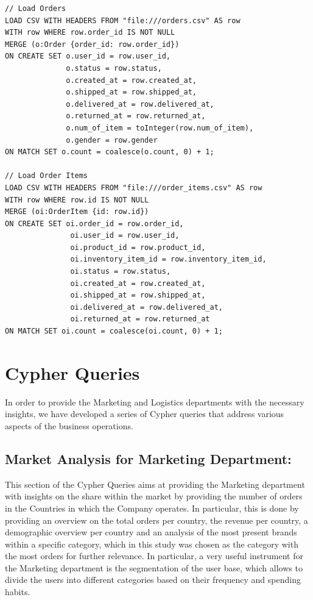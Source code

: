 \documentclass[a4paper,12pt]{article}
\begin{document}
\begin{verbatim}
// Load Orders
LOAD CSV WITH HEADERS FROM "file:///orders.csv" AS row
WITH row WHERE row.order_id IS NOT NULL
MERGE (o:Order {order_id: row.order_id})
ON CREATE SET o.user_id = row.user_id,
              o.status = row.status,
              o.created_at = row.created_at,
              o.shipped_at = row.shipped_at,
              o.delivered_at = row.delivered_at,
              o.returned_at = row.returned_at,
              o.num_of_item = toInteger(row.num_of_item),
              o.gender = row.gender
ON MATCH SET o.count = coalesce(o.count, 0) + 1;

// Load Order Items
LOAD CSV WITH HEADERS FROM "file:///order_items.csv" AS row
WITH row WHERE row.id IS NOT NULL
MERGE (oi:OrderItem {id: row.id})
ON CREATE SET oi.order_id = row.order_id,
               oi.user_id = row.user_id,
               oi.product_id = row.product_id,
               oi.inventory_item_id = row.inventory_item_id,
               oi.status = row.status,
               oi.created_at = row.created_at,
               oi.shipped_at = row.shipped_at,
               oi.delivered_at = row.delivered_at,
               oi.returned_at = row.returned_at
ON MATCH SET oi.count = coalesce(oi.count, 0) + 1;
\end{verbatim}

\newpage
\section{Cypher Queries}
In order to provide the Marketing and Logistics departments with the necessary insights, we have developed a series of Cypher queries that address various aspects of the business operations.
\subsection{Market Analysis for Marketing Department:}
This section of the Cypher Queries aims at providing the Marketing department with insights on the share within the market by providing the number of orders in the Countries in which the Company operates.
In particular, this is done by providing an overview on the total orders per country, the revenue per country, a demographic overview per country and an analysis of the most present brands within a specific 
category, which in this study was chosen as the category with the most orders for further relevance.
In particular, a very useful instrument for the Marketing department is the segmentation of the user base, which allows to divide the users into different categories based on their frequency and spending habits.
\end{document}
